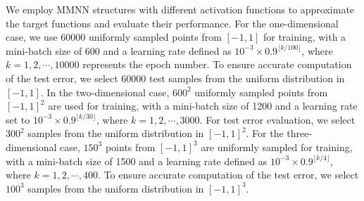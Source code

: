 \documentclass[11pt,a4paper]{article}
\let\ldots\cdots
\begin{document}

We employ MMNN structures with different activation functions to approximate the target functions and evaluate their performance.
For the one-dimensional case, we use 60000 uniformly sampled points from \([-1, 1]\) for training, with a mini-batch size of 600 and a learning rate defined as \( 10^{-3} \times 0.9^{\lfloor k/100 \rfloor} \), where \( k = 1, 2, \ldots, 10000 \) represents the epoch number. To ensure accurate computation of the test error, we select 60000 test samples from the uniform distribution in \( [-1,1] \).
In the two-dimensional case, \( 600^2 \) uniformly sampled points from \( [-1,1]^2 \) are used for training, with a mini-batch size of 1200 and a learning rate set to \( 10^{-3} \times 0.9^{\lfloor k/30 \rfloor} \), where \( k = 1, 2, \ldots, 3000 \). For test error evaluation, we select \( 300^2 \) samples from the uniform distribution in \( [-1,1]^2 \).
For the three-dimensional case, \( 150^3 \) points from \( [-1,1]^3 \) are uniformly sampled for training, with a mini-batch size of 1500 and a learning rate defined as \( 10^{-3} \times 0.9^{\lfloor k/4 \rfloor} \), where \( k = 1, 2, \ldots, 400 \). To ensure accurate computation of the test error, we select \( 100^3 \) samples from the uniform distribution in \( [-1,1]^3 \).



\end{document}
